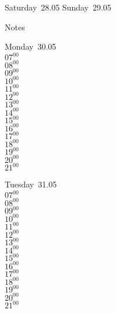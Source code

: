 \documentclass[11pt,a4paper]{book}\usepackage[]{graphicx}\usepackage[]{color}
\begin{document}
\begin{weekendbox}
  Saturday~28.05
  \tcblower
  Sunday~29.05
\end{weekendbox} %
\begin{notebox}
  Notes
\end{notebox}
\clearpage
\begin{headerbox}
\end{headerbox}
\begin{weekdaybox}
  Monday~30.05\\
  { 
  \vfill
  $07^{00}$\\
$08^{00}$\\
$09^{00}$\\
$10^{00}$\\
$11^{00}$\\
$12^{00}$\\
$13^{00}$\\
$14^{00}$\\
$15^{00}$\\
$16^{00}$\\
$17^{00}$\\
$18^{00}$\\
$19^{00}$\\
$20^{00}$\\
$21^{00}$\\
  }
\end{weekdaybox}
\begin{weekdaybox}
  Tuesday~31.05\\
  { 
  \vfill
  $07^{00}$\\
$08^{00}$\\
$09^{00}$\\
$10^{00}$\\
$11^{00}$\\
$12^{00}$\\
$13^{00}$\\
$14^{00}$\\
$15^{00}$\\
$16^{00}$\\
$17^{00}$\\
$18^{00}$\\
$19^{00}$\\
$20^{00}$\\
$21^{00}$\\
  }
\end{weekdaybox}
\end{document}
